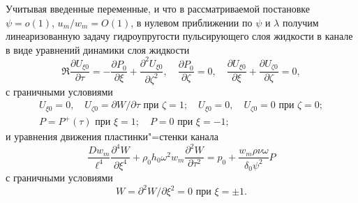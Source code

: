 \documentclass[12pt,a4paper]{article}
\begin{document}
Учитывая введенные переменные, и что в рассматриваемой постановке $\psi = o(1)$, $u_m/w_m = O(1)$, в нулевом приближении по $\psi$ и $\lambda$ получим линеаризованную задачу гидроупругости пульсирующего слоя жидкости в канале в виде уравнений динамики слоя жидкости
\begin{equation}
\Re \frac{\partial U_{\xi 0}}{\partial \tau} = -\frac{\partial P_0}{\partial \xi} + \frac{\partial^2 U_{\xi 0}}{\partial \zeta^2}, \quad \frac{\partial P_0}{\partial \zeta} = 0, \quad \frac{\partial U_{\xi 0}}{\partial \xi} + \frac{\partial U_{\zeta 0}}{\partial \zeta} = 0,
\end{equation}
с граничными условиями
\begin{gather}
U_{\xi 0} = 0, \quad U_{\zeta 0} = \partial W / \partial \tau \text{ при } \zeta = 1; \quad U_{\xi 0} = 0, \quad U_{\zeta 0} = 0 \text{ при } \zeta = 0; \\
P = P^+(\tau) \text{ при } \xi = 1; \quad P = 0 \text{ при } \xi = -1;
\end{gather}
и уравнения движения пластинки"=стенки канала
\begin{equation}
\frac{D w_m}{\ell^4} \frac{\partial^4 W}{\partial \xi^4} + \rho_0 h_0 \omega^2 w_m \frac{\partial^2 W}{\partial \tau^2} = p_0 + \frac{w_m \rho \nu \omega}{\delta_0 \psi^2} P
\end{equation}
с граничными условиями
\begin{equation}
W = \partial^2 W / \partial \xi^2 = 0 \text{ при } \xi = \pm 1.
\end{equation}
\end{document}
